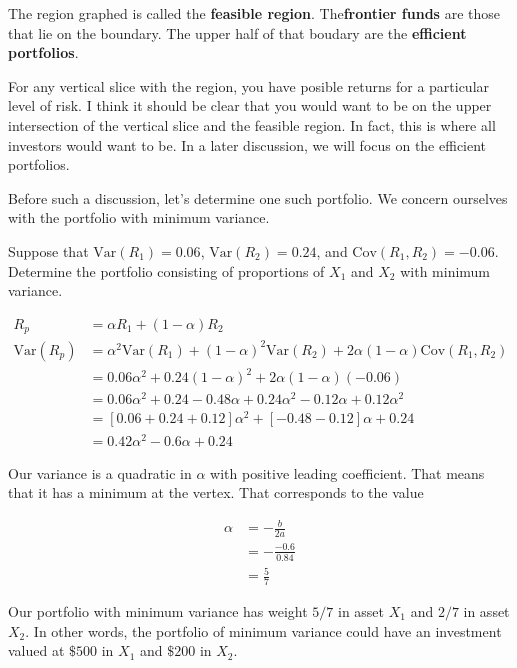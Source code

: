 \documentclass{ximera}
\begin{document}
\begin{definition}
The region graphed is called the {\bf feasible region}. The{\bf frontier funds} are those that lie on the boundary. The upper half of that boudary are the {\bf efficient portfolios}. 
\end{definition}

For any vertical slice with the region, you have posible returns for a particular level of risk. I think it should be clear that you would want to be on the upper intersection of the vertical slice and the feasible region. In fact, this is where all investors would want to be. In a later discussion, we will focus on the efficient portfolios. 

Before such a discussion, let's determine one such portfolio. We concern ourselves with the portfolio with minimum variance.

\begin{example}
Suppose that $\text{Var}(R_1)=0.06$, $\text{Var}(R_2)=0.24$, and $\text{Cov}(R_1, R_2)=-0.06$. Determine the portfolio consisting of proportions of $X_1$ and $X_2$ with minimum variance.
\end{example}

\begin{solution}
	\begin{align*}
	R_p 			&=\alpha R_1+(1-\alpha)R_2\\
	\text{Var}(R_p)	&=\alpha^2\text{Var}(R_1)+(1-\alpha)^2\text{Var}(R_2)+2\alpha(1-\alpha)\text{Cov}(R_1, R_2)\\
				&=0.06\alpha^2+0.24(1-\alpha)^2+2\alpha(1-\alpha)(-0.06)\\
				&=0.06\alpha^2+0.24-0.48\alpha+0.24\alpha^2-0.12\alpha+0.12\alpha^2\\
				&=[0.06+0.24+0.12]\alpha^2+[-0.48-0.12]\alpha+0.24\\
				&=0.42\alpha^2-0.6\alpha+0.24
	\end{align*}

Our variance is a quadratic in $\alpha$ with positive leading coefficient. That means that it has a minimum at the vertex. That corresponds to the value

	\begin{align*}
	\alpha	&=-\frac{b}{2a}\\
		&=-\frac{-0.6}{0.84}\\
		&=\frac{5}{7}
	\end{align*}

Our portfolio with minimum variance has weight $5/7$ in asset $X_1$ and $2/7$ in asset $X_2$. In other words, the portfolio of minimum variance could have an investment valued at $\$500$ in $X_1$ and $\$200$ in $X_2$. 
\end{solution}
\end{document}
